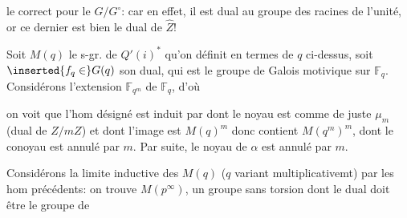 
le  correct pour le $G/G^\circ$: car en effet, il est dual au groupe des racines de l'unité, or ce dernier est bien le dual de $\widehat Z$!


Soit $M(q)$ le s-gr. de $Q'(i)^*$ qu'on définit en termes de $q$ ci-dessus, soit  $\inserted{f_q\in}G(q)$ son dual, qui est le groupe de Galois motivique sur $\mathbb F_q$. Considérons l'extension $\mathbb F_{q^m}$ de $\mathbb F_q$, d'où


 on voit que l'hom désigné \unsure{$\alpha$} est induit par
dont le noyau est comme de juste  $\mu_m$ (dual de $Z/mZ$) et dont l'image est $M(q)^m$ donc contient $M(q^m)^m$, dont le conoyau est annulé par $m$. Par suite, le  noyau de $\alpha$ est annulé par $m$.

 Considérons la limite inductive des $M(q)$ ($q$ variant multiplicativemt) par les hom précédents: on trouve $M(p^\infty)$, un groupe sans torsion dont le dual doit être le groupe de

